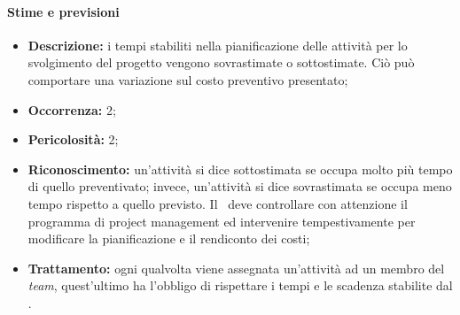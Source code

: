 \paragraph{Stime e previsioni}
\begin{itemize}
	\item \textbf{Descrizione:} i tempi stabiliti nella pianificazione delle attività per lo svolgimento del progetto vengono sovrastimate o sottostimate. Ciò può comportare una variazione sul costo preventivo presentato;
	\item \textbf{Occorrenza:} 2;
	\item \textbf{Pericolosità:} 2;
	\item \textbf{Riconoscimento:} un’attività si dice sottostimata se occupa molto più tempo di quello preventivato; invece, un'attività si dice sovrastimata se occupa meno tempo rispetto a quello previsto. Il \textit{\RdP}\ deve controllare con attenzione il programma di project management ed intervenire tempestivamente per modificare la pianificazione e il rendiconto dei costi;
	\item \textbf{Trattamento:} ogni qualvolta viene assegnata un'attività ad un membro del \textit{team}, quest'ultimo ha l'obbligo di rispettare i tempi e le scadenza stabilite dal \textit{\RdP}.
\end{itemize}